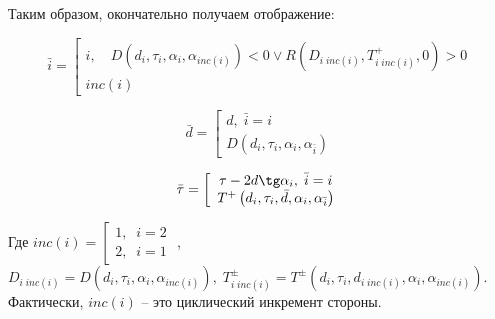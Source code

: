 \documentclass[a4paper]{article}
\begin{document}
%

Таким образом, окончательно получаем отображение:

\begin{equation} \label{GrindEQ__26_}\bar{i}=\left[\begin{array}{c} {i,\quad D\left(d_{i} ,\tau _{i} ,\alpha _{i} ,\alpha _{inc\left(i\right)} \right)<0\vee R\left(D_{i\; inc(i)} ,T^{+}_{i\; inc(i)},0\right)>0} \\ {inc\left(i\right)} \end{array}\right. \end{equation}

\begin{equation} \label{GrindEQ__27_}\bar{d}=\left[\begin{array}{c} {d,\; \bar{i}=i} \\ {D\left(d_{i} ,\tau _{i} ,\alpha _{i} ,\alpha _{\bar{i}}\right)} \end{array}\right. \end{equation}

\begin{equation} \label{GrindEQ__28_}\bar{\tau }=\left[\begin{array}{c} {\tau -2 d \tg \alpha_{i},\; \bar{i}=i} \\ {T^{+}\left(d_{i} ,\tau _{i} ,\bar{d},\alpha_i,\alpha_{\bar{i}} \right)} \end{array}\right. \end{equation}

Где $inc\left(i\right)=\left[\begin{array}{c} {1,\; \; i=2} \\ {2,\; \; i=1} \end{array}\right. $ , $D_{i\; inc(i)} =D\left(d_{i} ,\tau _{i} ,\alpha _{i} ,\alpha _{inc\left(i\right)}\right),\; T^{\pm }_{i\; inc(i)} =T^{\pm }\left(d_{i} ,\tau _{i} ,d_{i\; inc\left(i\right)},\alpha _{i} ,\alpha _{inc\left(i\right)} \right)$. Фактически, $inc\left(i\right)$ -- это циклический инкремент стороны.
\end{document}
